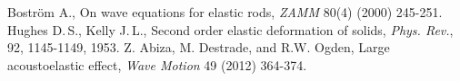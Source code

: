 \documentclass[12pt, a4paper]{report}
\begin{document}
\begin{thebibliography}{99}
	 Bostr\"{o}m A., On wave equations for elastic rods, \textit{ZAMM} 80(4) (2000) 245-251. 
	 Hughes D.\,S., Kelly J.\,L., Second order elastic deformation of solids, \textit{Phys. Rev.}, 92,  1145-1149, 1953.
	 Z. Abiza, M. Destrade, and R.W. Ogden, Large acoustoelastic effect, \textit{Wave Motion} 49 (2012) 364-374.
\end{thebibliography}
\end{document}
